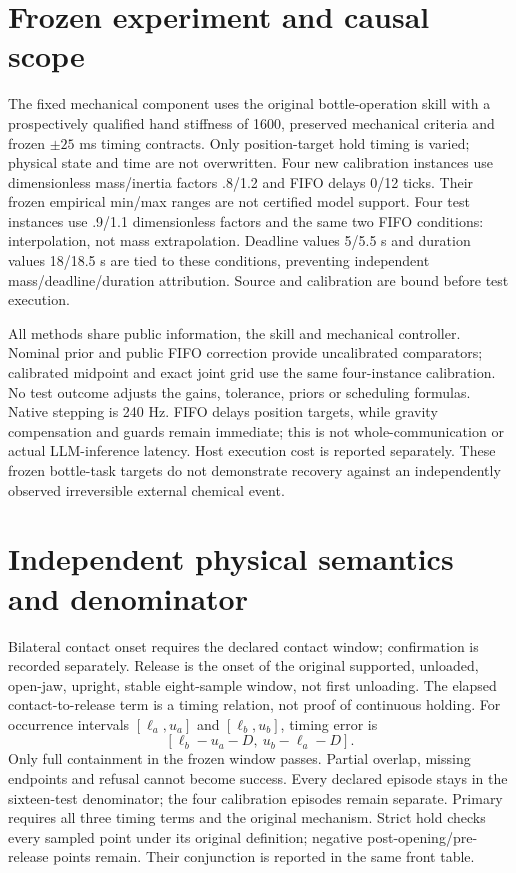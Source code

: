 \documentclass{article}
\begin{document}
\section{Frozen experiment and causal scope}
The fixed mechanical component uses the original bottle-operation
skill with a prospectively qualified hand stiffness of 1600, preserved
mechanical criteria and frozen $\pm25$ ms timing contracts. Only
position-target hold timing is varied; physical state and time are not
overwritten. Four new calibration instances use dimensionless mass/inertia factors .8/1.2
and FIFO delays 0/12 ticks. Their frozen empirical min/max ranges are
not certified model support. Four test instances use .9/1.1 dimensionless factors and
the same two FIFO conditions: interpolation, not mass extrapolation.
Deadline values 5/5.5 s and duration values 18/18.5 s are tied to these
conditions, preventing independent mass/deadline/duration attribution.
Source \texttt{\SourceShort} and calibration \texttt{\CalibrationShort}
are bound before test execution.

All methods share public information, the skill and mechanical
controller. Nominal prior and public FIFO correction provide uncalibrated comparators; calibrated midpoint and exact joint grid
use the same four-instance calibration. No test outcome adjusts the
gains, tolerance, priors or scheduling formulas. Native stepping is
240 Hz. FIFO delays position targets, while gravity compensation and
guards remain immediate; this is not whole-communication or actual
LLM-inference latency. Host execution cost is reported separately. These frozen bottle-task
targets do not demonstrate recovery against an independently observed
irreversible external chemical event.

\section{Independent physical semantics and denominator}
Bilateral contact onset requires the declared contact window;
confirmation is recorded separately. Release is the onset of the
original supported, unloaded, open-jaw, upright, stable eight-sample
window, not first unloading. The elapsed contact-to-release term is a
timing relation, not proof of continuous holding. For occurrence
intervals $[\ell_a,u_a]$ and $[\ell_b,u_b]$, timing error is
\[
 [\ell_b-u_a-D,\ u_b-\ell_a-D].
\]
Only full containment in the frozen window passes. Partial overlap,
missing endpoints and refusal cannot become success. Every declared
episode stays in the sixteen-test denominator; the four calibration
episodes remain separate. Primary requires all three timing terms
and the original mechanism. Strict hold checks every sampled point
under its original definition; negative post-opening/pre-release
points remain. Their conjunction is reported in the same front table.
\end{document}
